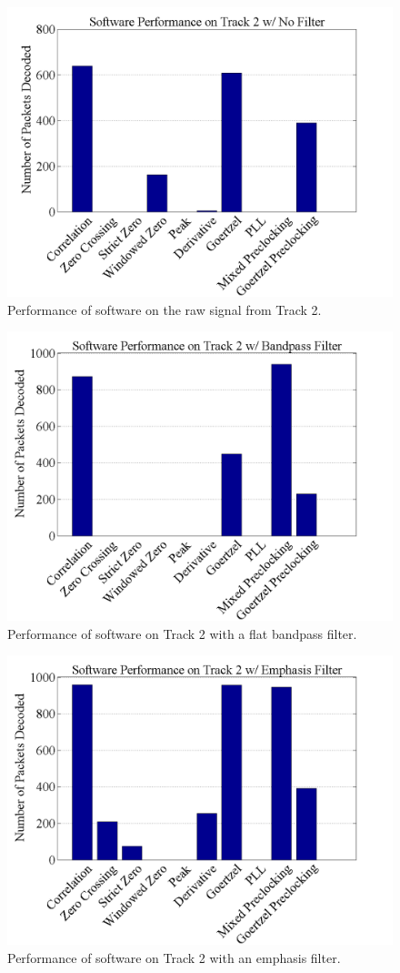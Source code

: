 \begin{figure}
  \centering
	\includegraphics[width=0.75\linewidth]{images/SoftwarePerformanceonTrack2wNoFilter.png} 
	\caption{Performance of software on the raw signal from Track 2.}
   \label{T2FiltNo}
\end{figure}
\begin{figure}
  \centering
	\includegraphics[width=0.75\linewidth]{images/SoftwarePerformanceonTrack2wBandpassFilter.png} 
	\caption{Performance of software on Track 2 with a flat bandpass filter.}
   \label{T2Filt0}
\end{figure}
\begin{figure}
  \centering
	\includegraphics[width=0.75\linewidth]{images/SoftwarePerformanceonTrack2wEmphasisFilter.png} 
	\caption{Performance of software on Track 2 with an emphasis filter.}
   \label{T2Filt6}
\end{figure}


